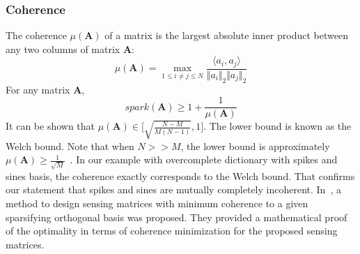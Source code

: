 \documentclass[journal]{IEEEtran}
\begin{document}
\subsubsection{Coherence}
The coherence $\mu(\boldsymbol{A})$ of a matrix is the largest absolute inner product between any two columns of matrix $\boldsymbol{A}$:
%
\begin{equation} \label{eq:coherence}
	\mu(\boldsymbol{A})=\max\limits_{1\leq i\neq j\leq N}\frac{\langle a_i,
		a_j\rangle}{\Vert a_i\Vert_2 \Vert a_j\Vert_2}
\end{equation}
%
For any matrix $\boldsymbol{A}$,
\begin{equation} \label{eq:coherence_spark}
	spark(\boldsymbol{A})\geq 1+\frac{1}{\mu(\boldsymbol{A})}
\end{equation}
%
%
It can be shown that $\mu(\boldsymbol{A})\in \big[\sqrt{\frac{N-M}{M(N-1)}}, 1\big]$. The lower bound is known as the Welch bound. Note that when $N>>M$, the lower bound is approximately $\mu(\boldsymbol{A})\geq \frac{1}{\sqrt{M}}$~\cite{donoho2003optimally}. In our example with overcomplete dictionary with spikes and sines basis, the coherence exactly corresponds to the Welch bound. That confirms our statement that spikes and sines are mutually completely incoherent. In~\cite{Pereira2014}, a method to design sensing matrices with minimum coherence to a given sparsifying orthogonal basis was proposed. They provided a mathematical proof of the optimality in terms of coherence minimization for the proposed sensing matrices.
\end{document}
